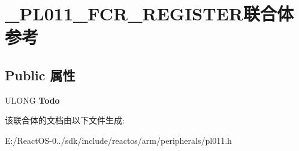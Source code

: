 \hypertarget{union___p_l011___f_c_r___r_e_g_i_s_t_e_r}{}\section{\+\_\+\+P\+L011\+\_\+\+F\+C\+R\+\_\+\+R\+E\+G\+I\+S\+T\+E\+R联合体 参考}
\label{union___p_l011___f_c_r___r_e_g_i_s_t_e_r}
\subsection*{Public 属性}
\begin{DoxyCompactItemize}
\item 
\mbox{\label{union___p_l011___f_c_r___r_e_g_i_s_t_e_r_ad788dd069c4fbb0a860badb9d049b5fc}} 
U\+L\+O\+NG {\bfseries Todo}
\end{DoxyCompactItemize}


该联合体的文档由以下文件生成\+:\begin{DoxyCompactItemize}
\item 
E\+:/\+React\+O\+S-\/0../sdk/include/reactos/arm/peripherals/pl011.\+h\end{DoxyCompactItemize}
